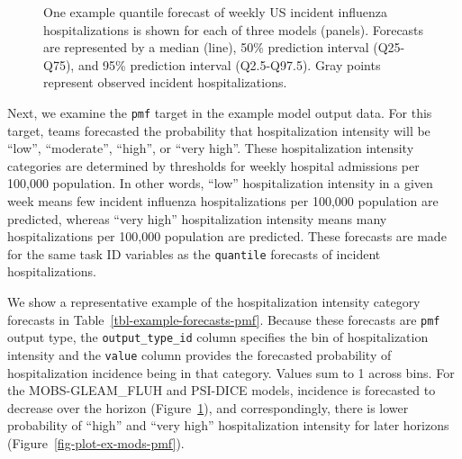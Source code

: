 \documentclass[
]{article}
\begin{document}
\begin{figure}[H]


\caption{\label{fig-plot-ex-mods}One example quantile forecast of weekly
US incident influenza hospitalizations is shown for each of three models
(panels). Forecasts are represented by a median (line), 50\% prediction
interval (Q25-Q75), and 95\% prediction interval (Q2.5-Q97.5). Gray
points represent observed incident hospitalizations.}

\end{figure}%

Next, we examine the \texttt{pmf} target in the example model output
data. For this target, teams forecasted the probability that
hospitalization intensity will be ``low'', ``moderate'', ``high'', or
``very high''. These hospitalization intensity categories are determined
by thresholds for weekly hospital admissions per 100,000 population. In
other words, ``low'' hospitalization intensity in a given week means few
incident influenza hospitalizations per 100,000 population are
predicted, whereas ``very high'' hospitalization intensity means many
hospitalizations per 100,000 population are predicted. These forecasts
are made for the same task ID variables as the \texttt{quantile}
forecasts of incident hospitalizations.

We show a representative example of the hospitalization intensity
category forecasts in Table~\ref{tbl-example-forecasts-pmf}. Because
these forecasts are \texttt{pmf} output type, the
\texttt{output\_type\_id} column specifies the bin of hospitalization
intensity and the \texttt{value} column provides the forecasted
probability of hospitalization incidence being in that category. Values
sum to 1 across bins. For the MOBS-GLEAM\_FLUH and PSI-DICE models,
incidence is forecasted to decrease over the horizon
(Figure~\ref{fig-plot-ex-mods}), and correspondingly, there is lower
probability of ``high'' and ``very high'' hospitalization intensity for
later horizons (Figure~\ref{fig-plot-ex-mods-pmf}).
\end{document}
